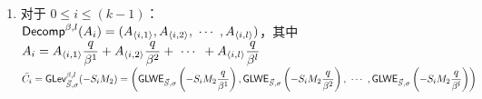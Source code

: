\begin{myproof}
\begin{enumerate}
因此： \\
$\langle \textsf{Decomp}^{\beta, l}(B), \bar{C_k} \rangle$\\
$= B_1 \cdot \textsf{GLWE}_{\vec{S}, \sigma} \left (M_{2}\dfrac{q}{\beta^1} \right ) + B_2 \cdot \textsf{GLWE}_{\vec{S}, \sigma} \left (M_{2}\dfrac{q}{\beta^2} \right ) + \gap{$\cdots$} + B_l \cdot \textsf{GLWE}_{\vec{S}, \sigma} \left (M_{2}\dfrac{q}{\beta^l}\right)$ \\
$= \textsf{GLWE}_{\vec{S}, \sigma} \left (B_1M_{2}\dfrac{q}{\beta^1} \right ) + \textsf{GLWE}_{\vec{S}, \sigma} \left (B_2M_{2}\dfrac{q}{\beta^2} \right ) + \gap{$\cdots$} + \textsf{GLWE}_{\vec{S}, \sigma} \left (B_lM_{2}\dfrac{q}{\beta^l}\right)$ \textcolor{red}{ $\rhd$ 由 \autoref{sec:glwe-mult-plain} 可得} \\
$= \textsf{GLWE}_{\vec{S}, \sigma} \left (B_1M_{2}\dfrac{q}{\beta^1} + B_2M_{2}\dfrac{q}{\beta^2} + \gap{$\cdots$} + B_lM_{2}\dfrac{q}{\beta^l}\right)$ \textcolor{red}{ $\rhd$ 由 \autoref{sec:glwe-add-cipher} 可得}\\
$= \textsf{GLWE}_{\vec{S}, \sigma} \left (M_{2} \cdot \left ( B_1\dfrac{q}{\beta^1} + B_2\dfrac{q}{\beta^2} + \gap{$\cdots$} + B_l\dfrac{q}{\beta^l} \right)\right)$ \\
$= \textsf{GLWE}_{\vec{S}, \sigma} (M_{2}B)$ \textcolor{red}{ $\rhd$ 由 \autoref{subsec:poly-decomp} 可得}
\item 对于 $0 \leq i \leq (k - 1)$： \\
$\textsf{Decomp}^{\beta, l}(A_i) = (A_{\langle i, 1 \rangle}, A_{\langle i, 2 \rangle}, \text{ } \text{$\cdots$} \text{ }, A_{\langle i, l \rangle})$，其中 $A_i = A_{\langle i, 1 \rangle}\dfrac{q}{\beta^1} + A_{\langle i, 2 \rangle}\dfrac{q}{\beta^2} + \text{ } \text{$\cdots$} \text{ } + A_{\langle i, l \rangle}\dfrac{q}{\beta^l}$ \\
$\bar{C_i} =  \textsf{GLev}_{\vec{S}, \sigma}^{\beta, l}(-S_iM_2) = \left(\textsf{GLWE}_{\vec{S}, \sigma}\left(-S_iM_2\dfrac{q}{\beta^1}\right), \textsf{GLWE}_{\vec{S}, \sigma}\left(-S_iM_2\dfrac{q}{\beta^2}\right), \text{ } \text{$\cdots$} \text{ }, \textsf{GLWE}_{\vec{S}, \sigma}\left(-S_iM_2\dfrac{q}{\beta^l}\right) \right)$ \\


\end{enumerate}
\end{myproof}
